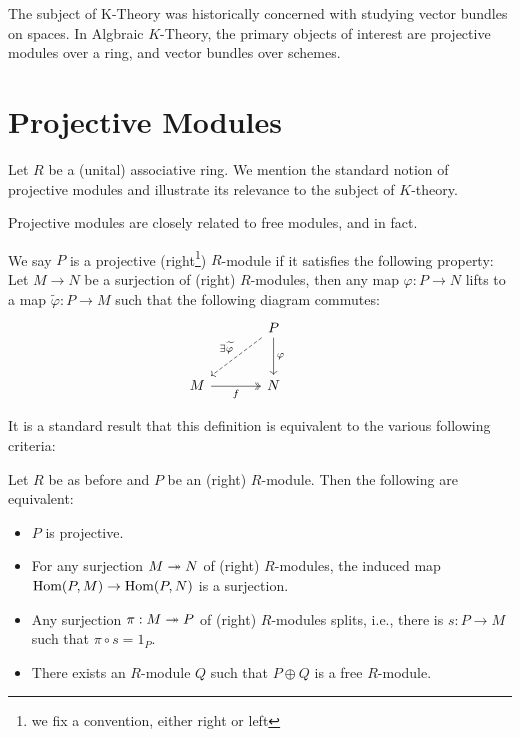 The subject of K-Theory was historically concerned with studying vector bundles on spaces.
In Algbraic $K$-Theory, the primary objects of interest are projective modules over a ring, and vector bundles over
schemes.

\section{Projective Modules}

  Let $R$ be a (unital) associative ring. We mention the standard notion of projective modules  
  and illustrate its relevance to the subject of $K$-theory.

  Projective modules are closely related to free modules, and in fact.

\begin{definition}
  We say $P$ is a projective (right\footnote{we fix a convention, either right or left}) $R$-module if it satisfies the following property:
    Let $M \to N$ be a surjection of (right) $R$-modules, then any map $\varphi : P \to N$ lifts to
  a map $\widetilde{\varphi} : P \to M$ such that the following diagram commutes:
  \[ 
   \begin{tikzcd}[row sep=large, column sep=large]
                     & P \arrow[dl, dashed, "\exists\widetilde\varphi"'] \arrow[d, "\varphi"] & \\
    M \arrow[r, two heads, "f"'] & N
    \end{tikzcd}
  \]
\end{definition}

It is a standard result that this definition is equivalent to the various following criteria:
\begin{proposition}
Let $R$ be as before and $P$ be an (right) $R$-module. Then the following are equivalent: 
\begin{itemize}
  \item [(i)] $P$ is projective. 
  \item [(ii)] For any surjection $M \twoheadrightarrow N$ of (right) $R$-modules, the induced map $\text{Hom}(P,M) \to \text{Hom}(P,N)$
  is a surjection.
  \item [(iii)] Any surjection $\pi : M \twoheadrightarrow P$ of (right) $R$-modules splits, i.e., there is $s : P \to M$ such that $\pi \circ s = 1_P$.
  \item [(iv)] There exists an $R$-module $Q$ such that $P \oplus Q$ is a free $R$-module.
\end{itemize}
\end{proposition}

